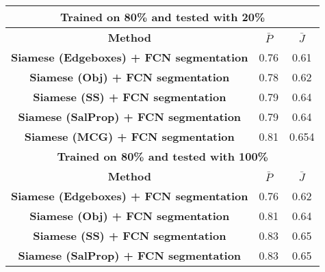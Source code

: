 \documentclass[conference]{IEEEtran}
\begin{document}
\begin{table}[]
\begin{tabular}{||c| c |c||}
\multicolumn{3}{||c||}{\textbf{Trained on 80\% and tested with 20\%}}                                                                   \\\hline
\textbf{Method} & $\bar{\textit{P}}$ & $\bar{\textit{J}}$\\\hline
\textbf{Siamese (Edgeboxes) + FCN segmentation}                                   & 0.76                             & 0.61                             \\\hline
\textbf{Siamese (Obj) + FCN segmentation}                                         & 0.78                             & 0.62                             \\\hline
\textbf{Siamese (SS) + FCN segmentation}                                          & 0.79                             & 0.64                             \\\hline
\textbf{Siamese (SalProp) + FCN segmentation}                                     & 0.79                             & 0.64                             \\\hline
\textbf{Siamese (MCG) + FCN segmentation}                                         & 0.81                             & 0.654                            \\\hline\hline
\multicolumn{3}{||c||}{\textbf{Trained on 80\% and tested with 100\%}}   \\                                                  \hline             
\textbf{Method} & $\bar{\textit{P}}$ & $\bar{\textit{J}}$\\\hline
\textbf{Siamese (Edgeboxes) + FCN segmentation}                                   & 0.76                             & 0.62                             \\\hline
\textbf{Siamese (Obj) + FCN segmentation}                                         & 0.81                             & 0.64                             \\\hline
\textbf{Siamese (SS) + FCN segmentation}                                          & 0.83                             & 0.65                             \\\hline
\textbf{Siamese (SalProp) + FCN segmentation}                                     & 0.83                             & 0.65                             \\\hline

\end{tabular}
\end{table}
\end{document}
